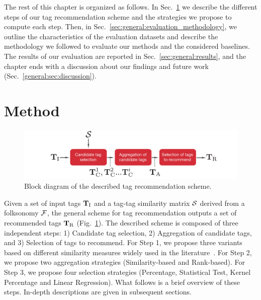 The rest of this chapter is organized as follows. 
In Sec.~\ref{sec:general:method} we describe the different steps of our tag recommendation scheme and the strategies we propose to compute each step.
Then, in Sec.~\ref{sec:general:evaluation_methodology}, we outline the characteristics of the evaluation datasets and describe the methodology we followed to evaluate our methods and the considered baselines.
The results of our evaluation are reported in Sec.~\ref{sec:general:results}, and the chapter ends with a discussion about our findings and future work (Sec.~\ref{general:sec:discussion}). 


\section{Method}
\label{sec:general:method}

\begin{figure}[t]
  \centerline{
  \includegraphics[width=\figSizeMax]{ch03_general/pics/00_diagram_alt.pdf}}
  \caption[Block diagram of the tag recommendation scheme]{Block diagram of the described tag recommendation scheme.}
  \label{general:fig:diagram}
\end{figure}

Given a set of input tags $\mathbf{T}_{\text{I}}$ and a tag-tag similarity matrix $\mathcal{S}$ derived from a folksonomy $\mathcal{F}$, the general scheme for tag recommendation outputs a set of recommended tags $\mathbf{T}_{\text{R}}$ (Fig.~\ref{general:fig:diagram}). 
The described scheme is composed of three independent steps: 1) Candidate tag selection, 2) Aggregation of candidate tags, and 3) Selection of tags to recommend. For Step 1, we propose three variants based on different similarity measures widely used in the literature~\citep[tag co-occurrence, cosine and Jaccard similarity;][]{halpin2006,jaske2007,Mika2007a,Sigurbjornsson2008,meo2009,Markines2009}. For Step 2, we propose two aggregation strategies (Similarity-based and Rank-based). For Step 3, we propose four selection strategies (Percentage, Statistical Test, Kernel Percentage and Linear Regression). What follows is a brief overview of these steps. In-depth descriptions are given in subsequent sections.

